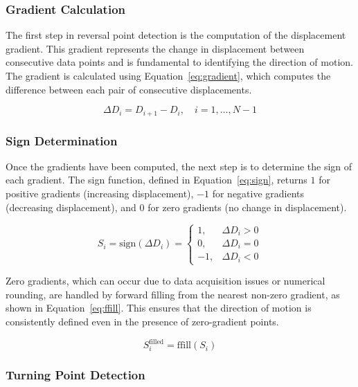 \documentclass[11pt,a4paper]{article}
\begin{document}
\subsubsection{Gradient Calculation}

The first step in reversal point detection is the computation of the displacement gradient. This gradient represents the change in displacement between consecutive data points and is fundamental to identifying the direction of motion. The gradient is calculated using Equation~\ref{eq:gradient}, which computes the difference between each pair of consecutive displacements.

\begin{equation}
\Delta D_i = D_{i+1} - D_i, \quad i = 1, \ldots, N-1
\label{eq:gradient}
\end{equation}

\subsubsection{Sign Determination}

Once the gradients have been computed, the next step is to determine the sign of each gradient. The sign function, defined in Equation~\ref{eq:sign}, returns \(1\) for positive gradients (increasing displacement), \(-1\) for negative gradients (decreasing displacement), and \(0\) for zero gradients (no change in displacement).

\begin{equation}
S_i = \text{sign}(\Delta D_i) = 
\begin{cases}
1, & \Delta D_i > 0 \\
0, & \Delta D_i = 0 \\
-1, & \Delta D_i < 0
\end{cases}
\label{eq:sign}
\end{equation}

Zero gradients, which can occur due to data acquisition issues or numerical rounding, are handled by forward filling from the nearest non-zero gradient, as shown in Equation~\ref{eq:ffill}. This ensures that the direction of motion is consistently defined even in the presence of zero-gradient points.

\begin{equation}
S_i^{\text{filled}} = \text{ffill}(S_i)
\label{eq:ffill}
\end{equation}

\subsubsection{Turning Point Detection}
\end{document}

